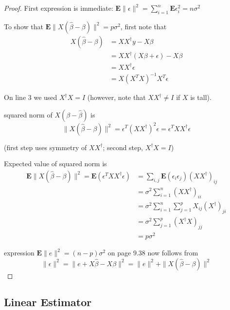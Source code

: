 \begin{proof}
    First expression is immediate: $ \mathbf{E}\|\epsilon\|^{2}=\sum_{i=1}^{n} \mathbf{E} \epsilon_{i}^{2}=n \sigma^{2} $

    To show that $ \mathbf{E}\|X(\hat{\beta}-\beta)\|^{2}=p \sigma^{2} $, first note that
$$
\begin{aligned}
X(\hat{\beta}-\beta) &=X X^{\dagger} y-X \beta \\
&=X X^{\dagger}(X \beta+\epsilon)-X \beta \\
&=X X^{\dagger} \epsilon \\
&=X\left(X^{T} X\right)^{-1} X^{T} \epsilon
\end{aligned}
$$

On line 3 we used $ X^{\dagger} X=I $ (however, note that $ X X^{\dagger} \neq I $ if $ X $ is tall).

\begin{theorem}
    squared norm of $ X(\beta-\hat{\beta}) $ is
$$
\|X(\hat{\beta}-\beta)\|^{2}=\epsilon^{T}\left(X X^{\dagger}\right)^{2} \epsilon=\epsilon^{T} X X^{\dagger} \epsilon
$$

(first step uses symmetry of $ X X^{\dagger} $; second step, $ X^{\dagger} X=I $)
\end{theorem}



Expected value of squared norm is
$$
\begin{aligned}
\mathbf{E}\|X(\hat{\beta}-\beta)\|^{2}=\mathbf{E}\left(\epsilon^{T} X X^{\dagger} \epsilon\right) &=\sum_{i, j} \mathbf{E}\left(\epsilon_{i} \epsilon_{j}\right)\left(X X^{\dagger}\right)_{i j} \\
&=\sigma^{2} \sum_{i=1}^{n}\left(X X^{\dagger}\right)_{i i} \\
&=\sigma^{2} \sum_{i=1}^{n} \sum_{j=1}^{p} X_{i j}\left(X^{\dagger}\right)_{j i} \\
&=\sigma^{2} \sum_{j=1}^{p}\left(X^{\dagger} X\right)_{j j} \\
&=p \sigma^{2}
\end{aligned}
$$

expression $ \mathbf{E}\|e\|^{2}=(n-p) \sigma^{2} $ on page $ 9.38 $ now follows from
$$
\|\epsilon\|^{2}=\|e+X \hat{\beta}-X \beta\|^{2}=\|e\|^{2}+\|X(\hat{\beta}-\beta)\|^{2}
$$
\end{proof}


\subsection{Linear Estimator}

